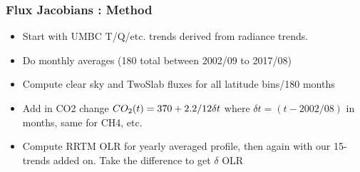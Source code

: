 \documentclass[10pt,t]{beamer}
\begin{document}
\begin{frame}
  \frametitle{Flux Jacobians : Method}
  \begin{itemize}
  \item Start with UMBC T/Q/etc. trends derived from radiance trends.
  \item Do monthly averages (180 total between 2002/09 to 2017/08)
  \item Compute clear sky and TwoSlab fluxes for all latitude bins/180 months
  \item Add in CO2 change $CO_2(t) = 370 + 2.2/12 \delta t$ where $\delta t = (t-2002/08)$ in months, same for CH4, etc.
  \item Compute RRTM OLR for yearly averaged profile, then again with our 15-trends added on. Take the difference to get $\delta$ OLR
  \end{itemize}
\end{frame}
\end{document}
